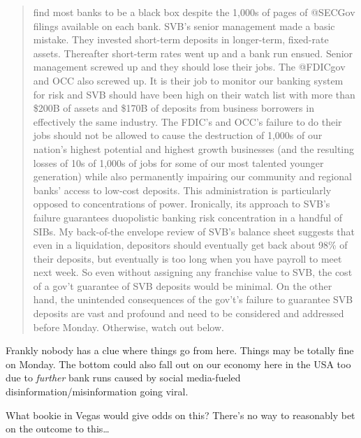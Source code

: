 \begin{quote}
{find most banks to be a black box despite the 1,000s of pages of @SECGov
filings available on each bank. SVB's senior management made a basic
mistake. They invested short-term deposits in longer-term, fixed-rate
assets. Thereafter short-term rates went up and a bank run ensued.
Senior management screwed up and they should lose their jobs. The
@FDICgov and OCC also screwed up. It is their job to monitor our banking
system for risk and SVB should have been high on their watch list with
more than \$200B of assets and \$170B of deposits from business
borrowers in effectively the same industry. The FDIC's and OCC's failure
to do their jobs should not be allowed to cause the destruction of
1,000s of our nation's highest potential and highest growth businesses
(and the resulting losses of 10s of 1,000s of jobs for some of our most
talented younger generation) while also permanently impairing our
community and regional banks' access to low-cost deposits. This
administration is particularly opposed to concentrations of power.
Ironically, its approach to SVB's failure guarantees duopolistic banking
risk concentration in a handful of SIBs. My back-of-the envelope review
of SVB's balance sheet suggests that even in a liquidation, depositors
should eventually get back about 98\% of their deposits, but eventually
is too long when you have payroll to meet next week. So even without
assigning any franchise value to SVB, the cost of a gov't guarantee of
SVB deposits would be minimal. On the other hand, the unintended
consequences of the gov't's failure to guarantee SVB deposits are vast
and profound and need to be considered and addressed before Monday.
Otherwise, watch out below.}
\end{quote}

Frankly nobody has a clue where things go from here. Things may be
totally fine on Monday. The bottom could also fall out on our economy
here in the USA too due to \emph{further} bank runs caused by social
media-fueled disinformation/misinformation going viral.

What bookie in Vegas would give odds on this? There's no way to
reasonably bet on the outcome to this\ldots{}
